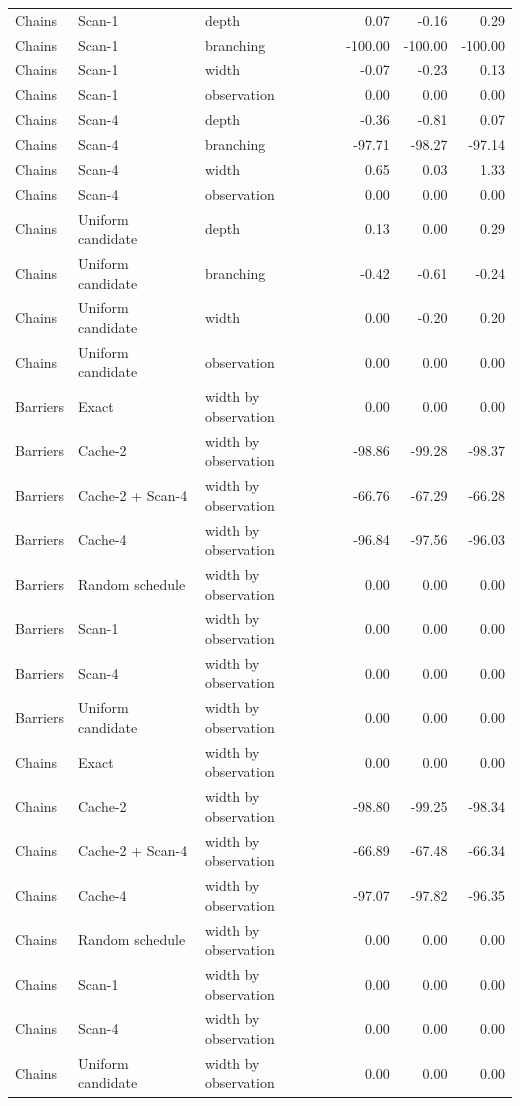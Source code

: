 \begin{longtable}{lllrrr}
Chains & Scan-1 & depth & 0.07 & -0.16 & 0.29\\
Chains & Scan-1 & branching & -100.00 & -100.00 & -100.00\\
Chains & Scan-1 & width & -0.07 & -0.23 & 0.13\\
Chains & Scan-1 & observation & 0.00 & 0.00 & 0.00\\
Chains & Scan-4 & depth & -0.36 & -0.81 & 0.07\\
Chains & Scan-4 & branching & -97.71 & -98.27 & -97.14\\
Chains & Scan-4 & width & 0.65 & 0.03 & 1.33\\
Chains & Scan-4 & observation & 0.00 & 0.00 & 0.00\\
Chains & Uniform candidate & depth & 0.13 & 0.00 & 0.29\\
Chains & Uniform candidate & branching & -0.42 & -0.61 & -0.24\\
Chains & Uniform candidate & width & 0.00 & -0.20 & 0.20\\
Chains & Uniform candidate & observation & 0.00 & 0.00 & 0.00\\
Barriers & Exact & width by observation & 0.00 & 0.00 & 0.00\\
Barriers & Cache-2 & width by observation & -98.86 & -99.28 & -98.37\\
Barriers & Cache-2 + Scan-4 & width by observation & -66.76 & -67.29 & -66.28\\
Barriers & Cache-4 & width by observation & -96.84 & -97.56 & -96.03\\
Barriers & Random schedule & width by observation & 0.00 & 0.00 & 0.00\\
Barriers & Scan-1 & width by observation & 0.00 & 0.00 & 0.00\\
Barriers & Scan-4 & width by observation & 0.00 & 0.00 & 0.00\\
Barriers & Uniform candidate & width by observation & 0.00 & 0.00 & 0.00\\
Chains & Exact & width by observation & 0.00 & 0.00 & 0.00\\
Chains & Cache-2 & width by observation & -98.80 & -99.25 & -98.34\\
Chains & Cache-2 + Scan-4 & width by observation & -66.89 & -67.48 & -66.34\\
Chains & Cache-4 & width by observation & -97.07 & -97.82 & -96.35\\
Chains & Random schedule & width by observation & 0.00 & 0.00 & 0.00\\
Chains & Scan-1 & width by observation & 0.00 & 0.00 & 0.00\\
Chains & Scan-4 & width by observation & 0.00 & 0.00 & 0.00\\
Chains & Uniform candidate & width by observation & 0.00 & 0.00 & 0.00\\
\bottomrule
\end{longtable}